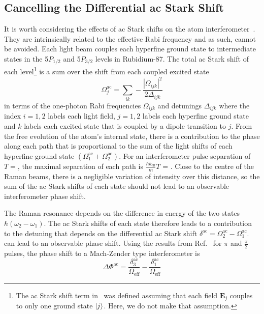 \subsection{Cancelling the Differential ac Stark
Shift}\label{subsec:light_shift}
It is worth considering the effects of ac Stark shifts on the atom
interferometer~\cite{Gauguet2008}. They are intrinsically related to the
effective Rabi frequency and as such, cannot be avoided. Each light
beam couples each hyperfine ground state to intermediate states in the
5$P_{1/2}$ and 5$P_{3/2}$ levels in Rubidium-87. The total ac Stark
shift of each level\footnote{The ac Stark shift term
in~ was defined assuming that each
field $\textbf{E}_j$ couples to only one ground state $\ket{j}$. Here,
we do not make that assumption.} is a sum over the shift from each
coupled excited state
\begin{equation}
  \Omega_j^\text{ac} = \sum_{ik} -\frac{|\Omega_{ijk}|^2}{2\Delta_{ijk}}
\end{equation}
in terms of the one-photon Rabi frequencies \(\Omega_{ijk}\) and detunings \(\Delta_{ijk}\) where the index $i = 1,2$ labels each light field, $j = 1,2$ labels
each hyperfine ground state and $k$ labels each excited state that is
coupled by a dipole transition to $j$. From the free evolution of the atom's internal state, there is a contribution to the phase along each path that is
proportional to the sum of the light shifts of each hyperfine ground
state $(\Omega_1^\text{ac} +
\Omega_2^\text{ac})$. For an interferometer pulse separation of $T=
$, the maximal separation of each path is
$\frac{\hbar k_\text{eff}}{m} T$ = . Close to
the centre of the Raman beams, there is a negligible variation of
intensity over this distance, so the sum of the ac Stark shifts of
each state should not lead to an observable interferometer phase
shift.
\par\noindent
The Raman resonance depends on the difference in energy of the two
states $\hbar(\omega_2 - \omega_1)$. The ac Stark shifts of each state
therefore leads to a contribution to the detuning that depends on the differential ac Stark shift \(\delta^\text{ac}
= \Omega_2^\text{ac} - \Omega_1^\text{ac}\). can lead to an observable
phase shift. Using the results from Ref.~\cite{Weiss1994} for \(\pi\)
and \(\frac{\pi}{2}\) pulses, the phase shift to a Mach-Zender type
interferometer is
\begin{equation}
  \Delta \Phi^\text{ac} =
  \frac{\delta_3^\text{ac}}{\Omega_\text{eff}} - \frac{\delta_1^\text{ac}}{\Omega_\text{eff}} 
 \label{eq:diff_phase}
\end{equation}
